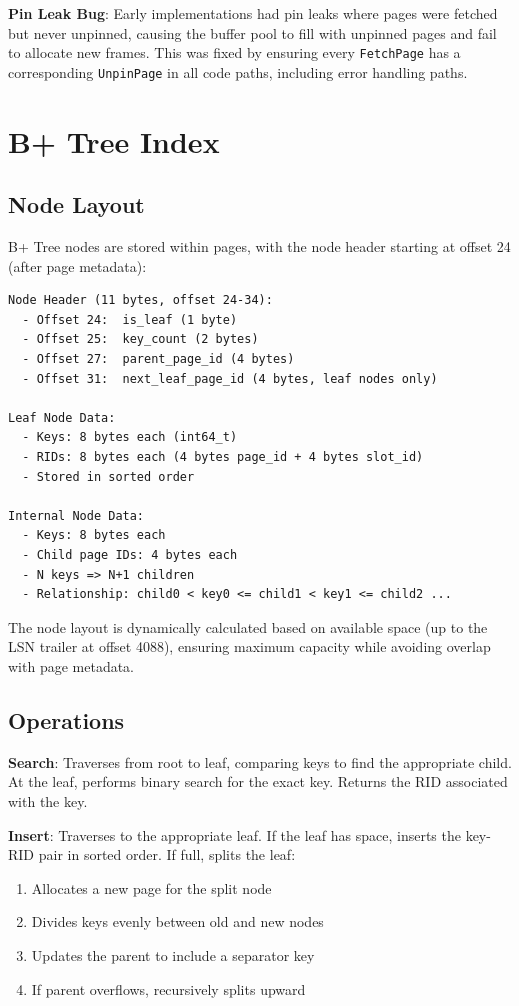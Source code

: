\documentclass{article}
\begin{document}
\textbf{Pin Leak Bug}: Early implementations had pin leaks where pages were fetched but never unpinned, causing the buffer pool to fill with unpinned pages and fail to allocate new frames. This was fixed by ensuring every \texttt{FetchPage} has a corresponding \texttt{UnpinPage} in all code paths, including error handling paths.

\section{B+ Tree Index}

\subsection{Node Layout}

B+ Tree nodes are stored within pages, with the node header starting at offset 24 (after page metadata):

\begin{verbatim}
Node Header (11 bytes, offset 24-34):
  - Offset 24:  is_leaf (1 byte)
  - Offset 25:  key_count (2 bytes)
  - Offset 27:  parent_page_id (4 bytes)
  - Offset 31:  next_leaf_page_id (4 bytes, leaf nodes only)

Leaf Node Data:
  - Keys: 8 bytes each (int64_t)
  - RIDs: 8 bytes each (4 bytes page_id + 4 bytes slot_id)
  - Stored in sorted order

Internal Node Data:
  - Keys: 8 bytes each
  - Child page IDs: 4 bytes each
  - N keys => N+1 children
  - Relationship: child0 < key0 <= child1 < key1 <= child2 ...
\end{verbatim}

The node layout is dynamically calculated based on available space (up to the LSN trailer at offset 4088), ensuring maximum capacity while avoiding overlap with page metadata.

\subsection{Operations}

\textbf{Search}: Traverses from root to leaf, comparing keys to find the appropriate child. At the leaf, performs binary search for the exact key. Returns the RID associated with the key.

\textbf{Insert}: Traverses to the appropriate leaf. If the leaf has space, inserts the key-RID pair in sorted order. If full, splits the leaf:
\begin{enumerate}
    \item Allocates a new page for the split node
    \item Divides keys evenly between old and new nodes
    \item Updates the parent to include a separator key
    \item If parent overflows, recursively splits upward
\end{enumerate}
\end{document}
